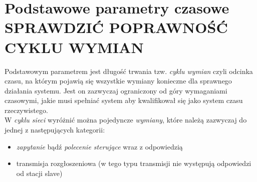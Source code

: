 \section{Podstawowe parametry czasowe {\Huge SPRAWDZIĆ POPRAWNOŚĆ CYKLU WYMIAN}}
Podstawowym parametrem jest długość trwania tzw. \textit{cyklu wymian} czyli odcinka czasu, na którym pojawią się wszystkie wymiany konieczne dla sprawnego działania systemu. Jest on zazwyczaj ograniczony od góry wymaganiami czasowymi, jakie musi spełniać system aby kwalifikował się jako system czasu rzeczywistego.\\
W \textit{cyklu sieci} wyróżnić można pojedyncze \textit{wymiany}, które należą zazwyczaj do jednej z następujących kategorii:
\begin{itemize}
	\item \textit{zapytanie} bądź \textit{polecenie sterujące} wraz z odpowiedzią
	\item transmisja rozgłoszeniowa (w tego typu transmisji nie występują odpowiedzi od stacji slave)
\end{itemize}

